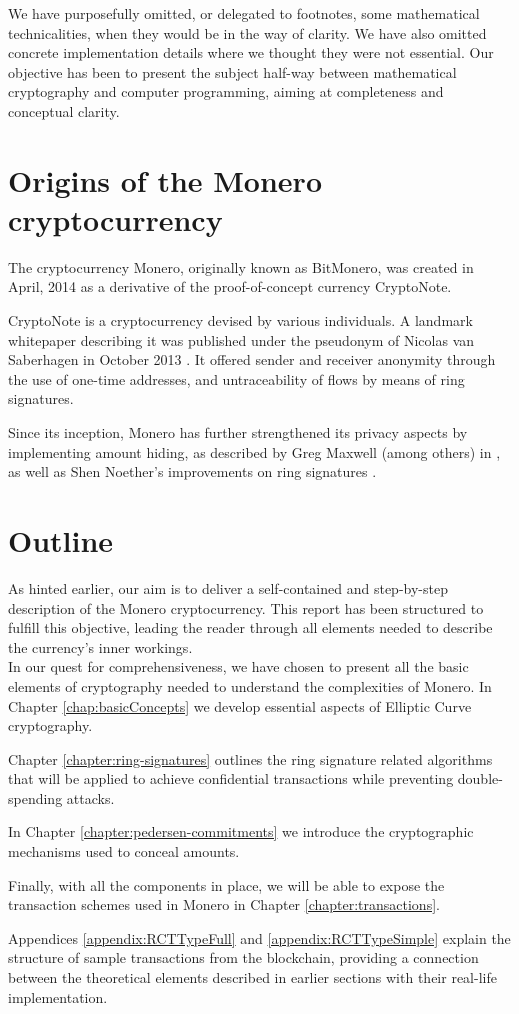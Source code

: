 We have purposefully omitted, or delegated to footnotes, some mathematical technicalities, when they would be in the way of clarity. We have also omitted concrete implementation details where we thought they were not essential. Our objective has been to present the subject half-way between mathematical cryptography and computer programming, aiming at completeness and conceptual clarity.



\section{Origins of the Monero cryptocurrency}

The cryptocurrency Monero, originally known as BitMonero, was created in April, 2014 as a derivative of the proof-of-concept currency CryptoNote.

CryptoNote is a cryptocurrency devised by various individuals. A landmark whitepaper describing it was published under the pseudonym of Nicolas van Saberhagen in October 2013 \cite{cryptoNoteWhitePaper}. It offered sender and receiver anonymity through the use of one-time addresses, and untraceability of flows by means of ring signatures.

Since its inception, Monero has further strengthened its privacy aspects by implementing amount hiding, as described by Greg Maxwell (among others) in \cite{Signatures2015BorromeanRS}, as well as Shen Noether's improvements
on ring signatures \cite{ledger34}.
  

\section{Outline}

As hinted earlier, our aim is to deliver a self-contained and step-by-step description of the Monero cryptocurrency. This report has been structured to fulfill this objective, leading the reader through all elements needed to describe the currency’s inner workings.
\\

In our quest for comprehensiveness, we have chosen to present all the basic elements of cryptography needed to understand the complexities of Monero. In Chapter \ref{chap:basicConcepts} we develop essential aspects of Elliptic Curve cryptography.

Chapter \ref{chapter:ring-signatures} outlines the ring signature related algorithms that will be applied to achieve confidential transactions while preventing double-spending attacks.

In Chapter \ref{chapter:pedersen-commitments} we introduce the cryptographic mechanisms used to conceal amounts.

Finally, with all the components in place, we will be able to expose the transaction schemes used in Monero in Chapter \ref{chapter:transactions}.


Appendices \ref{appendix:RCTTypeFull} and \ref{appendix:RCTTypeSimple} explain the structure of sample transactions from the blockchain, providing a connection between the theoretical elements described in earlier sections with their real-life implementation.
